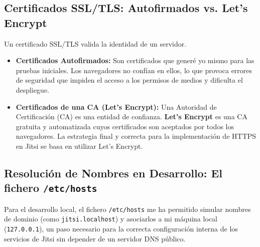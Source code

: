 \subsection{Certificados SSL/TLS: Autofirmados vs. Let's Encrypt}
Un certificado SSL/TLS valida la identidad de un servidor.
\begin{itemize}
    \item \textbf{Certificados Autofirmados:} Son certificados que generé yo mismo para las pruebas iniciales. Los navegadores no confían en ellos, lo que provoca errores de seguridad que impiden el acceso a los permisos de medios y dificulta el despliegue.
    \item \textbf{Certificados de una CA (Let's Encrypt):} Una Autoridad de Certificación (CA) es una entidad de confianza. \textbf{Let's Encrypt} \cite{letsencrypt_org} es una CA gratuita y automatizada cuyos certificados son aceptados por todos los navegadores. La estrategia final y correcta para la implementación de HTTPS en Jitsi se basa en utilizar Let's Encrypt.
\end{itemize}

\subsection{Resolución de Nombres en Desarrollo: El fichero \texttt{/etc/hosts}}
Para el desarrollo local, el fichero \texttt{/etc/hosts} me ha permitido simular nombres de dominio (como \texttt{jitsi.localhost}) y asociarlos a mi máquina local (\texttt{127.0.0.1}), un paso necesario para la correcta configuración interna de los servicios de Jitsi sin depender de un servidor DNS público.